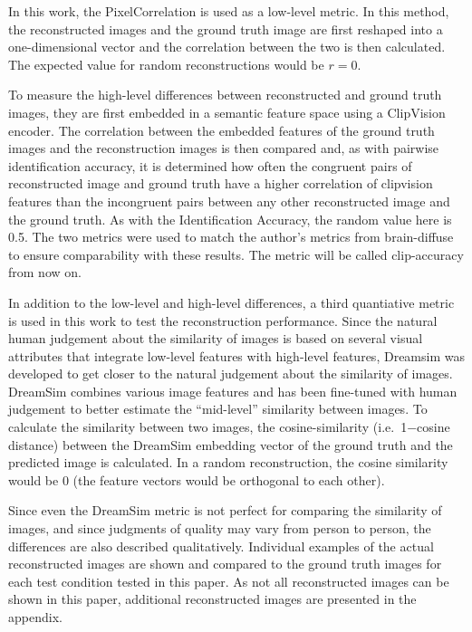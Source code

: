 In this work, the PixelCorrelation is used as a low-level metric\cite{shenDeepImageReconstruction2019,ozcelikNaturalSceneReconstruction2023}. In this method, the reconstructed images and the ground truth image are first reshaped into a one-dimensional vector and the correlation between the two is then calculated. The expected value for random reconstructions would be $r=0$.

To measure the high-level differences between reconstructed and ground truth images, they are first embedded in a semantic feature space using a ClipVision encoder\cite{radfordLearningTransferableVisual2021}. The correlation between the embedded features of the ground truth images and the reconstruction images is then compared and, as with pairwise identification accuracy, it is determined how often the congruent pairs of reconstructed image and ground truth have a higher correlation of clipvision features than the incongruent pairs between any other reconstructed image and the ground truth. As with the Identification Accuracy, the random value here is 0.5. The two metrics were used to match the author's metrics from brain-diffuse\cite{ozcelikNaturalSceneReconstruction2023} to ensure comparability with these results. The metric will be called clip-accuracy from now on.

In addition to the low-level and high-level differences, a third quantiative metric is used in this work to test the reconstruction performance. Since the natural human judgement about the similarity of images is based on several visual attributes that integrate low-level features with high-level features\cite{sundaramWhenDoesPerceptual2024}, Dreamsim\cite{fuDreamSimLearningNew2023} was developed to get closer to the natural judgement about the similarity of images. DreamSim combines various image features and has been fine-tuned with human judgement to better estimate the ``mid-level'' similarity between images. To calculate the similarity between two images, the cosine-similarity (i.e.\ 1\@ $-$\@ cosine distance) between the DreamSim embedding vector of the ground truth and the predicted image is calculated. In a random reconstruction, the cosine similarity would be 0 (the feature vectors would be orthogonal to each other).

Since even the DreamSim metric is not perfect for comparing the similarity of images, and since judgments of quality may vary from person to person, the differences are also described qualitatively. Individual examples of the actual reconstructed images are shown and compared to the ground truth images for each test condition tested in this paper.  As not all reconstructed images can be shown in this paper, additional reconstructed images are presented in the appendix.


